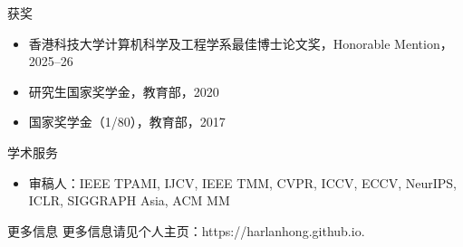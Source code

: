 \documentclass{resume}
\begin{document}
\begin{rSection}{获奖}

\begin{itemize}[leftmargin=10pt]
\setlength{\itemsep}{-3pt}
    \item 香港科技大学计算机科学及工程学系最佳博士论文奖，Honorable Mention，2025--26
    \item 研究生国家奖学金，教育部，2020
    \item 国家奖学金（1/80），教育部，2017
\end{itemize}

\end{rSection}

\begin{rSection}{学术服务}

\begin{itemize}[leftmargin=10pt]
\setlength{\itemsep}{-3pt}
    \item 审稿人：IEEE TPAMI, IJCV, IEEE TMM, CVPR, ICCV, ECCV, NeurIPS, ICLR, SIGGRAPH Asia, ACM MM
\end{itemize}

\end{rSection}

\begin{rSection}{更多信息}
更多信息请见个人主页：https://harlanhong.github.io.
\end{rSection}
\end{document}
